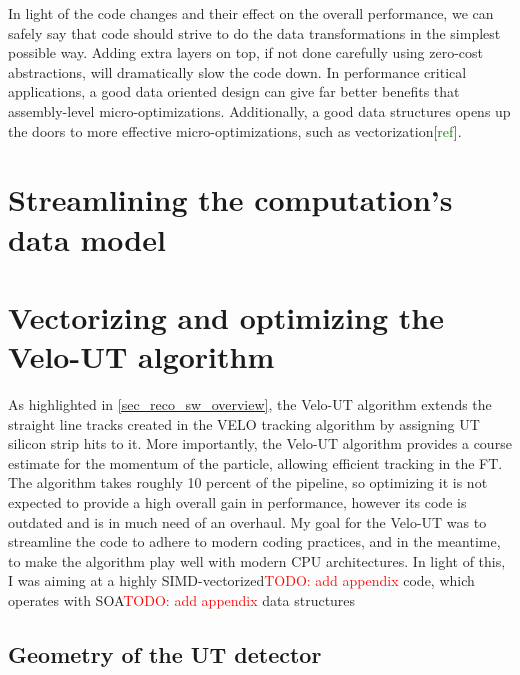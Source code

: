 \documentclass[12pt]{article}
\begin{document}
In light of the code changes and their effect on the overall performance, we can safely say that code should strive to do the data transformations in the simplest possible way. Adding extra layers on top, if not done carefully using zero-cost abstractions, will dramatically slow the code down. In performance critical applications, a good data oriented design can give far better benefits that assembly-level micro-optimizations. Additionally, a good data structures opens up the doors to more effective micro-optimizations, such as vectorization[\textcolor{green}{ref}].





\section{Streamlining the computation's data model}



\section{Vectorizing and optimizing the Velo-UT algorithm}\label{sec_opt_velout}


As highlighted in \ref{sec_reco_sw_overview}, the Velo-UT algorithm extends the straight line tracks created in the VELO tracking algorithm by assigning UT silicon strip hits to it. More importantly, the Velo-UT algorithm provides a course estimate for the momentum of the particle, allowing efficient tracking in the FT.
The algorithm takes roughly 10 percent of the pipeline, so optimizing it is not expected to provide a high overall gain in performance, however its code is outdated and is in much need of an overhaul. My goal for the Velo-UT was to streamline the code to adhere to modern coding practices, and in the meantime, to make the algorithm play well with modern CPU architectures. In light of this, I was aiming at a highly SIMD-vectorized\textcolor{red}{TODO: add appendix} code, which operates with SOA\textcolor{red}{TODO: add appendix} data structures

\subsection{Geometry of the UT detector}
\end{document}
